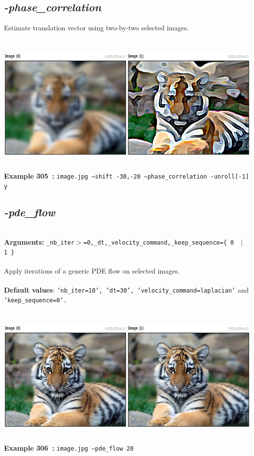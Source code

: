 \documentclass[a4paper,11pt,twoside]{book}
\begin{document}
\subsection{\emph{-phase\_correlation} }\vspace*{-0.5em}
Estimate translation vector using two-by-two selected images.
\begin{center}\includegraphics[keepaspectratio=true,height=7cm,width=\textwidth]{img/gmic_def305.jpg}\\
{\footnotesize \textbf{Example 305~:} \texttt{image.jpg --shift -30,-20 --phase\_correlation -unroll[-1] y}}
\end{center}

\subsection{\emph{-pde\_flow} }\vspace*{-0.5em}
~\\\textbf{Arguments: } 
{\small \texttt{\_nb\_iter$>$=0,\_dt,\_velocity\_command,\_keep\_sequence=\{ 0 ~$|$~ 1 \}}}\\~\\
Apply iterations of a generic PDE flow on selected images.
~\\~\\\textbf{Default values}: {\small \texttt{'nb\_iter=10', 'dt=30', 'velocity\_command=laplacian'} and \texttt{'keep\_sequence=0'.}}
\begin{center}\includegraphics[keepaspectratio=true,height=7cm,width=\textwidth]{img/gmic_def306.jpg}\\
{\footnotesize \textbf{Example 306~:} \texttt{image.jpg --pde\_flow 20}}
\end{center}
\end{document}
